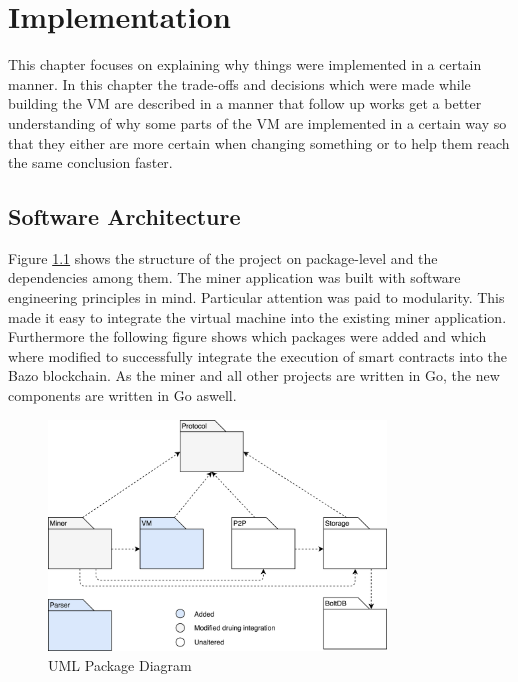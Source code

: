 \chapter{Implementation}
\thispagestyle{main} %
This chapter focuses on explaining why things were implemented in a certain manner. In this chapter the trade-offs and decisions which were made while building the VM are described in a manner that follow up works get a better understanding of why some parts of the VM are implemented in a certain way so that they either are more certain when changing something or to help them reach the same conclusion faster.

\section{Software Architecture}
Figure \ref{package overview} shows the structure of the project on package-level and the dependencies among them. The miner application was built with software engineering principles in mind. Particular attention was paid to modularity. This made it easy to integrate the virtual machine into the existing miner application. Furthermore the following figure shows which packages were added and which where modified to successfully integrate the execution of smart contracts into the Bazo blockchain. As the miner and all other projects are written in Go, the new components are written in Go aswell.
\begin{figure}[H]
	\begin{center}
	\includegraphics[width=0.8\textwidth]{./images/package-diagram}
	\caption{UML Package Diagram}
	\label{package overview}
	\end{center}
  \end{figure}

